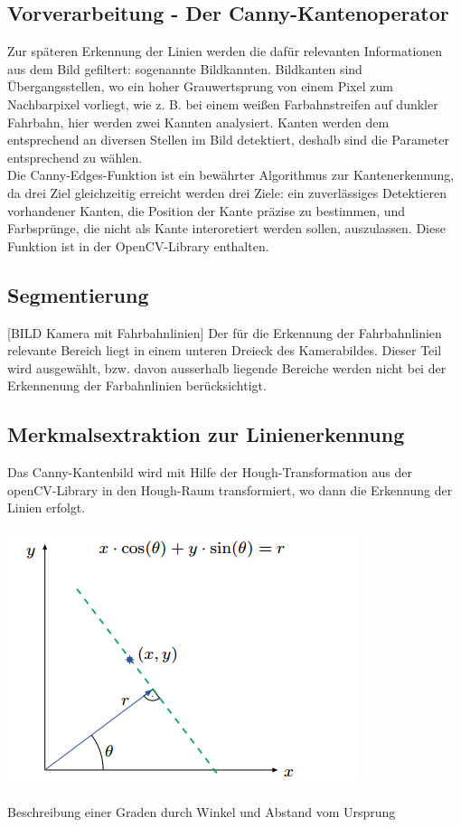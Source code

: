 \subsection{Vorverarbeitung - Der Canny-Kantenoperator}
Zur späteren Erkennung der Linien werden die dafür relevanten Informationen aus
dem Bild gefiltert: sogenannte Bildkannten. Bildkanten sind Übergangsstellen, wo
ein hoher Grauwertsprung von einem Pixel zum Nachbarpixel vorliegt, wie z. B. bei 
einem weißen Farbahnstreifen auf dunkler Fahrbahn, hier werden zwei Kannten
analysiert. Kanten werden dem entsprechend an diversen Stellen im Bild
detektiert, deshalb sind die Parameter entsprechend zu wählen.\\
Die Canny-Edges-Funktion ist ein bewährter Algorithmus zur Kantenerkennung, da drei Ziel
gleichzeitig erreicht werden drei Ziele: ein zuverlässiges Detektieren
vorhandener Kanten, die Position der Kante präzise zu bestimmen, und Farbsprünge, 
die nicht als Kante interoretiert werden sollen, auszulassen. Diese Funktion
ist in der OpenCV-Library enthalten. \\

\subsection{Segmentierung}
[BILD Kamera mit Fahrbahnlinien]
Der für die Erkennung der Fahrbahnlinien relevante Bereich liegt in einem
unteren Dreieck des Kamerabildes. Dieser Teil wird ausgewählt, bzw. davon ausserhalb
liegende Bereiche werden nicht bei der Erkennenung der Farbahnlinien
berücksichtigt.\\

\subsection{Merkmalsextraktion zur Linienerkennung}
Das Canny-Kantenbild wird mit Hilfe der Hough-Transformation aus der
openCV-Library in den Hough-Raum transformiert, wo dann die Erkennung der Linien
erfolgt.

\begin{minipage}{\columnwidth}
  \makeatletter
  \def\@captype{figure}
  \makeatother
  \centering
  \includegraphics[width=0.8\linewidth]{images/gradeThetaR.png}
  \caption{Beschreibung einer Graden durch Winkel und Abstand vom Ursprung}
  \label{fig:gradeThetaR}
\end{minipage}

